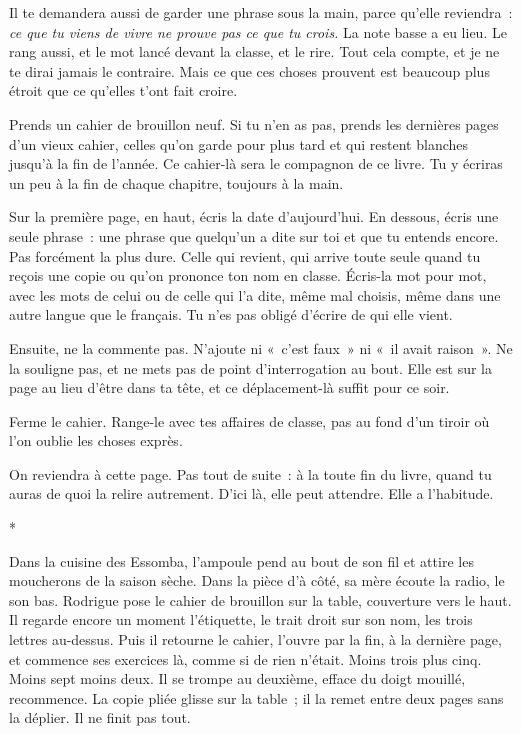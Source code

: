 \documentclass[10.5pt,twoside,openright]{book}
\newcommand{\asterisme}{\par\vspace{0.7em}\centerline{\color{gris}*\quad*\quad*}\vspace{0.7em}\par\noindent}
\newcommand{\soustitre}[1]{\par\vspace{1.1em}\noindent{\bfseries\color{accent}#1}\par\vspace{0.4em}\noindent}
\begin{document}
Il te demandera aussi de garder une phrase sous la main, parce qu’elle reviendra : \emph{ce que tu viens de vivre ne prouve pas ce que tu crois.} La note basse a eu lieu. Le rang aussi, et le mot lancé devant la classe, et le rire. Tout cela compte, et je ne te dirai jamais le contraire. Mais ce que ces choses prouvent est beaucoup plus étroit que ce qu’elles t’ont fait croire.

\soustitre{Ce soir, essaie ceci}

Prends un cahier de brouillon neuf. Si tu n’en as pas, prends les dernières pages d’un vieux cahier, celles qu’on garde pour plus tard et qui restent blanches jusqu’à la fin de l’année. Ce cahier-là sera le compagnon de ce livre. Tu y écriras un peu à la fin de chaque chapitre, toujours à la main.

Sur la première page, en haut, écris la date d’aujourd’hui. En dessous, écris une seule phrase : une phrase que quelqu’un a dite sur toi et que tu entends encore. Pas forcément la plus dure. Celle qui revient, qui arrive toute seule quand tu reçois une copie ou qu’on prononce ton nom en classe. Écris-la mot pour mot, avec les mots de celui ou de celle qui l’a dite, même mal choisis, même dans une autre langue que le français. Tu n’es pas obligé d’écrire de qui elle vient.

Ensuite, ne la commente pas. N’ajoute ni « c’est faux » ni « il avait raison ». Ne la souligne pas, et ne mets pas de point d’interrogation au bout. Elle est sur la page au lieu d’être dans ta tête, et ce déplacement-là suffit pour ce soir.

Ferme le cahier. Range-le avec tes affaires de classe, pas au fond d’un tiroir où l’on oublie les choses exprès.

On reviendra à cette page. Pas tout de suite : à la toute fin du livre, quand tu auras de quoi la relire autrement. D’ici là, elle peut attendre. Elle a l’habitude.

\asterisme

Dans la cuisine des Essomba, l’ampoule pend au bout de son fil et attire les moucherons de la saison sèche. Dans la pièce d’à côté, sa mère écoute la radio, le son bas. Rodrigue pose le cahier de brouillon sur la table, couverture vers le haut. Il regarde encore un moment l’étiquette, le trait droit sur son nom, les trois lettres au-dessus. Puis il retourne le cahier, l’ouvre par la fin, à la dernière page, et commence ses exercices là, comme si de rien n’était. Moins trois plus cinq. Moins sept moins deux. Il se trompe au deuxième, efface du doigt mouillé, recommence. La copie pliée glisse sur la table ; il la remet entre deux pages sans la déplier. Il ne finit pas tout.
\end{document}
